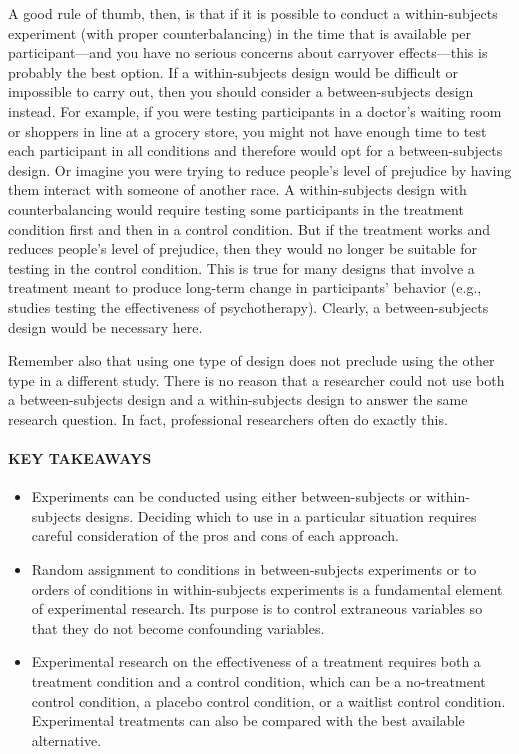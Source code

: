 \documentclass[
]{krantz}
\providecommand{\tightlist}{%
  \setlength{\itemsep}{0pt}\setlength{\parskip}{0pt}}
\begin{document}
A good rule of thumb, then, is that if it is possible to conduct a within-subjects experiment (with proper counterbalancing) in the time that is available per participant---and you have no serious concerns about carryover effects---this is probably the best option. If a within-subjects design would be difficult or impossible to carry out, then you should consider a between-subjects design instead. For example, if you were testing participants in a doctor's waiting room or shoppers in line at a grocery store, you might not have enough time to test each participant in all conditions and therefore would opt for a between-subjects design. Or imagine you were trying to reduce people's level of prejudice by having them interact with someone of another race. A within-subjects design with counterbalancing would require testing some participants in the treatment condition first and then in a control condition. But if the treatment works and reduces people's level of prejudice, then they would no longer be suitable for testing in the control condition. This is true for many designs that involve a treatment meant to produce long-term change in participants' behavior (e.g., studies testing the effectiveness of psychotherapy). Clearly, a between-subjects design would be necessary here.

Remember also that using one type of design does not preclude using the other type in a different study. There is no reason that a researcher could not use both a between-subjects design and a within-subjects design to answer the same research question. In fact, professional researchers often do exactly this.

\paragraph*{KEY TAKEAWAYS}\label{key-takeaways-7}

\begin{itemize}
\tightlist
\item
  Experiments can be conducted using either between-subjects or within-subjects designs. Deciding which to use in a particular situation requires careful consideration of the pros and cons of each approach.
\item
  Random assignment to conditions in between-subjects experiments or to orders of conditions in within-subjects experiments is a fundamental element of experimental research. Its purpose is to control extraneous variables so that they do not become confounding variables.
\item
  Experimental research on the effectiveness of a treatment requires both a treatment condition and a control condition, which can be a no-treatment control condition, a placebo control condition, or a waitlist control condition. Experimental treatments can also be compared with the best available alternative.
\end{itemize}
\end{document}
